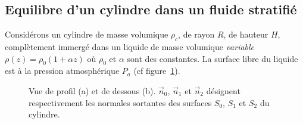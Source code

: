 {{\subsection{Equilibre d'un cylindre dans un fluide stratifi\'e}

Consid\'erons un cylindre de masse volumique $\rho_c$, de rayon $R$,
de hauteur $H$, compl\`etement immerg\'e dans un liquide de masse volumique
\textit{variable} $\rho(z) = \rho_0 (1 + \alpha z)$ o\`u $\rho_0$ et $\alpha$
sont des constantes.
La surface libre du liquide est \`a la pression atmosph\'erique $P_a$
(cf figure~\ref{fig:statique}).

\begin{figure}[htb]
\begin{center}
 \qquad 
\end{center}
\caption{Vue de profil (a) et de dessous (b).
$\vec{n}_0$, $\vec{n}_1$ et $\vec{n}_2$ d\'esignent respectivement
les normales sortantes des surfaces $S_0$, $S_1$ et $S_2$ du cylindre.}
\label{fig:statique}
\end{figure}

}}
